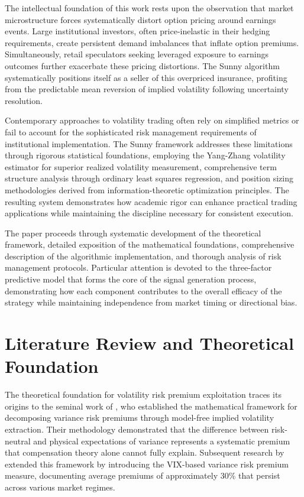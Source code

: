\documentclass[
  american,
  11pt,
  11pt,
  letterpaper,
  onecolumn]{article}
\begin{document}
The intellectual foundation of this work rests upon the observation that
market microstructure forces systematically distort option pricing
around earnings events. Large institutional investors, often
price-inelastic in their hedging requirements, create persistent demand
imbalances that inflate option premiums. Simultaneously, retail
speculators seeking leveraged exposure to earnings outcomes further
exacerbate these pricing distortions. The Sunny algorithm systematically
positions itself as a seller of this overpriced insurance, profiting
from the predictable mean reversion of implied volatility following
uncertainty resolution.

Contemporary approaches to volatility trading often rely on simplified
metrics or fail to account for the sophisticated risk management
requirements of institutional implementation. The Sunny framework
addresses these limitations through rigorous statistical foundations,
employing the Yang-Zhang volatility estimator for superior realized
volatility measurement, comprehensive term structure analysis through
ordinary least squares regression, and position sizing methodologies
derived from information-theoretic optimization principles. The
resulting system demonstrates how academic rigor can enhance practical
trading applications while maintaining the discipline necessary for
consistent execution.

The paper proceeds through systematic development of the theoretical
framework, detailed exposition of the mathematical foundations,
comprehensive description of the algorithmic implementation, and
thorough analysis of risk management protocols. Particular attention is
devoted to the three-factor predictive model that forms the core of the
signal generation process, demonstrating how each component contributes
to the overall efficacy of the strategy while maintaining independence
from market timing or directional bias.

\section{Literature Review and Theoretical
Foundation}\label{literature-review-and-theoretical-foundation}

The theoretical foundation for volatility risk premium exploitation
traces its origins to the seminal work of \textcite{carr2009}, who
established the mathematical framework for decomposing variance risk
premiums through model-free implied volatility extraction. Their
methodology demonstrated that the difference between risk-neutral and
physical expectations of variance represents a systematic premium that
compensation theory alone cannot fully explain. Subsequent research by
\textcite{bollerslev2009} extended this framework by introducing the
VIX-based variance risk premium measure, documenting average premiums of
approximately 30\% that persist across various market regimes.
\end{document}
